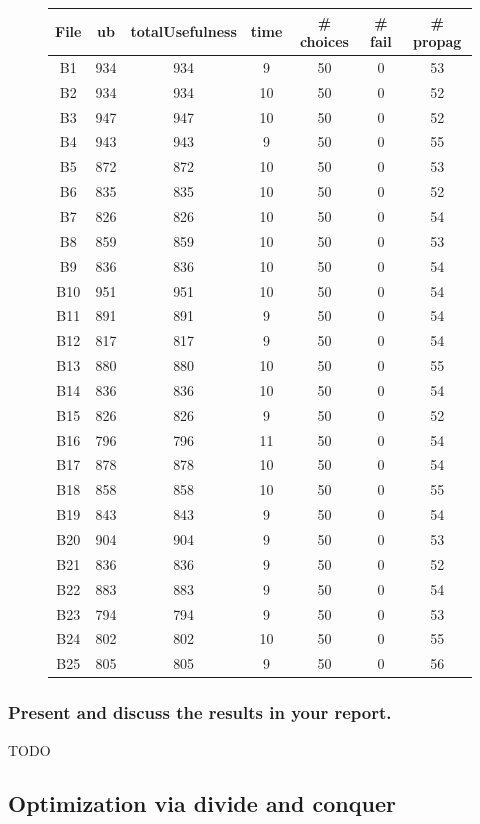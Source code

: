 \documentclass[a4paper ,12pt,french]{article}
\begin{document}
\begin{figure}[!h]
\begin{tabular}{|c|c|c|c|c|c|c|}
\hline
File & ub & totalUsefulness & time & \# choices & \# fail & \# propag\\
\hline
\hline
B1&934&934&9&50&0&53
\\ \hline
B2&934&934&10&50&0&52
\\ \hline
B3&947&947&10&50&0&52
\\ \hline
B4&943&943&9&50&0&55
\\ \hline
B5&872&872&10&50&0&53
\\ \hline
B6&835&835&10&50&0&52
\\ \hline
B7&826&826&10&50&0&54
\\ \hline
B8&859&859&10&50&0&53
\\ \hline
B9&836&836&10&50&0&54
\\ \hline
B10&951&951&10&50&0&54
\\ \hline
B11&891&891&9&50&0&54
\\ \hline
B12&817&817&9&50&0&54
\\ \hline
B13&880&880&10&50&0&55
\\ \hline
B14&836&836&10&50&0&54
\\ \hline
B15&826&826&9&50&0&52
\\ \hline
B16&796&796&11&50&0&54
\\ \hline
B17&878&878&10&50&0&54
\\ \hline
B18&858&858&10&50&0&55
\\ \hline
B19&843&843&9&50&0&54
\\ \hline
B20&904&904&9&50&0&53
\\ \hline
B21&836&836&9&50&0&52
\\ \hline
B22&883&883&9&50&0&54
\\ \hline
B23&794&794&9&50&0&53
\\ \hline
B24&802&802&10&50&0&55
\\ \hline
B25&805&805&9&50&0&56
\\ \hline
\end{tabular}
\end{figure}




\subsubsection{Present and discuss the results in your report.}

TODO

\subsection{Optimization via divide and conquer}
\end{document}
